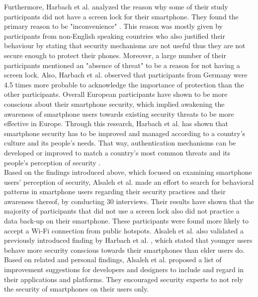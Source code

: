 Furthermore, Harbach et al. \cite{Harbach:2016} analyzed the reason why some of their study participants did not have a screen lock for their smartphone. They found the primary reason to be "inconvenience" \cite{Harbach:2016}. This reason was mostly given by participants from non-English speaking countries who also justified their behaviour by stating that security mechanisms are not useful thus they are not secure enough to protect their phones. Moreover, a large number of their participants mentioned an "absence of threat" \cite{Harbach:2016} to be a reason for not having a screen lock. Also, Harbach et al. \cite{Harbach:2016} observed that participants from Germany were 4.5 times more probable to acknowledge the importance of protection than the other participants. Overall European participants have shown to be more conscious about their smartphone security, which implied awakening the awareness of smartphone users towards existing security threats to be more effective in Europe. Through this research, Harbach et al. \cite{Harbach:2016} has shown that smartphone security has to be improved and managed according to a country's culture and its people's needs. That way, authentication mechanisms can be developed or improved to match a country's most common threats and its people's perception of security \cite{Harbach:2016}. \\ 

Based on the findings introduced above, which focused on examining smartphone users' perception of security, Alsaleh et al. \cite{Alsaleh} made an effort to search for behavioral patterns in smartphone users regarding their security practices and their awareness thereof, by conducting 30 interviews. Their results have shown that the majority of participants that did not use a screen lock also did not practice a data back-up on their smartphone. These participants were found more likely to accept a Wi-Fi connection from public hotspots. Alsaleh et al. \cite{Alsaleh} also validated a previously introduced finding by Harbach et al. \cite{Harbach:2016}, which stated that younger users behave more security conscious towards their smartphones than elder users do. Based on related and personal findings, Alsaleh et al. \cite{Alsaleh} proposed a list of improvement suggestions for developers and designers to include and regard in their applications and platforms. They encouraged security experts to not rely the security of smartphones on their users only.\\


